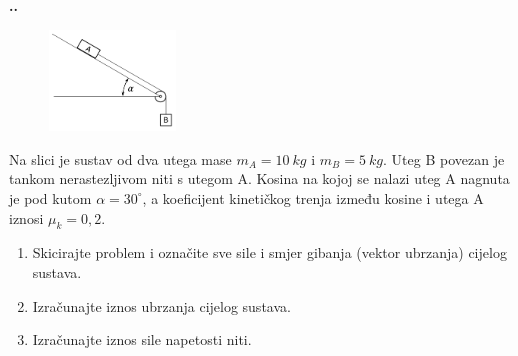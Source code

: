 

\noindent 
\textbf{
\thecjelina.\thezadatak.}
\begin{figure} %
    \centering
    \includegraphics[width=0.3\textwidth]{03_Dinamika_materijalne_tocke/kosina_5_2.png}
\end{figure}
Na slici  je sustav od dva utega mase $m_A=10\ kg$ i $m_B=5\ kg$. Uteg B povezan je tankom nerastezljivom niti s utegom A. 
Kosina na kojoj se nalazi uteg A nagnuta je pod kutom $\alpha=30^\circ$, a koeficijent kinetičkog trenja između kosine i utega A iznosi $\mu_k=0,2$.
\begin{enumerate}[label=\alph*)]
 \item Skicirajte problem i označite sve sile i smjer gibanja (vektor ubrzanja) cijelog sustava.
 \item Izračunajte iznos ubrzanja cijelog sustava.
 \item Izračunajte iznos sile napetosti niti.
\end{enumerate}

